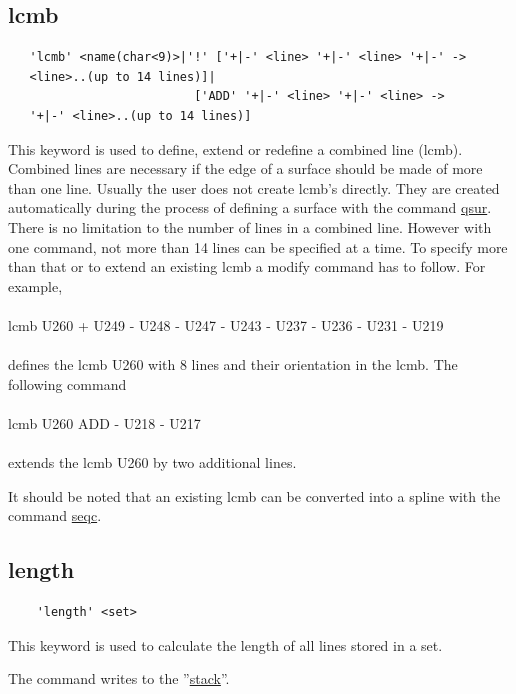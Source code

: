 \documentclass{article}
\providecommand{\htmlref}[2]{\hyperref[#2]{#1}}
\begin{document}
\subsection{\label{lcmb}lcmb}
\begin{verbatim}
   'lcmb' <name(char<9)>|'!' ['+|-' <line> '+|-' <line> '+|-' ->
   <line>..(up to 14 lines)]|
                          ['ADD' '+|-' <line> '+|-' <line> ->
   '+|-' <line>..(up to 14 lines)]
\end{verbatim}
This keyword is used to define, extend or redefine a combined line (lcmb). Combined lines are necessary if the edge of a surface should be made of more than one line. Usually the user does not create lcmb's directly. They are created automatically during the process of defining a surface with the command \htmlref{qsur}{qsur}. There is no limitation to the number of lines in a combined line. However with one command, not more than 14 lines can be specified at a time. To specify more than that or to extend an existing lcmb a modify command has to follow. For example,\\\\lcmb U260 + U249 - U248 - U247 - U243 - U237 - U236 - U231 - U219 \\\\defines the lcmb U260 with 8 lines and their orientation in the lcmb. The following command\\\\lcmb U260 ADD - U218 - U217\\\\extends the lcmb U260 by two additional lines.

It should be noted that an existing lcmb can be converted into a spline with the command \htmlref{seqc}{seqc}. 

\subsection{\label{length}length}
\begin{verbatim}
    'length' <set>
\end{verbatim}
This keyword is used to calculate the length of all lines stored in a set.

The command writes to the ''\htmlref{stack}{stack}''.
\end{document}
